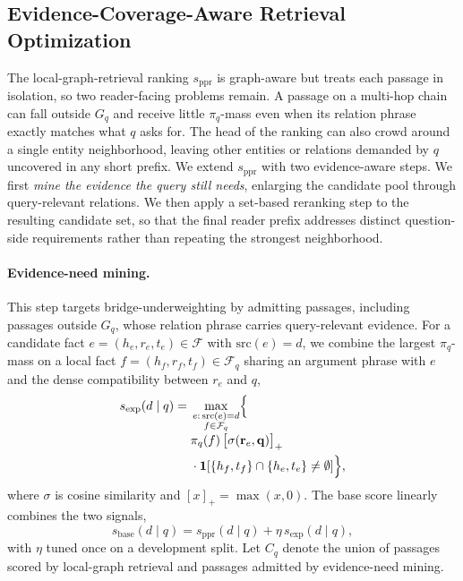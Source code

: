 \subsection{Evidence-Coverage-Aware Retrieval Optimization}
\label{sec:method:enhancement}

The local-graph-retrieval ranking $s_{\mathrm{ppr}}$ is graph-aware
but treats each passage in isolation, so two reader-facing problems
remain. A passage on a multi-hop chain can fall outside $G_q$ and
receive little $\pi_q$-mass even when its relation phrase exactly
matches what $q$ asks for. The head of the ranking can also crowd
around a single entity neighborhood, leaving other entities or
relations demanded by $q$ uncovered in any short prefix. We
extend $s_{\mathrm{ppr}}$ with two evidence-aware steps. We first
\emph{mine the evidence the query still needs}, enlarging the
candidate pool through query-relevant relations. We then apply a
set-based reranking step to the resulting candidate set, so that
the final reader prefix addresses distinct question-side
requirements rather than repeating the strongest neighborhood.

\paragraph{Evidence-need mining.}
This step targets bridge-underweighting by admitting passages,
including passages outside $G_q$, whose relation phrase carries
query-relevant evidence. For a candidate fact $e=(h_e,r_e,t_e)\in
\mathcal{F}$ with $\mathrm{src}(e)=d$, we combine the largest
$\pi_q$-mass on a local fact $f=(h_f,r_f,t_f)\in\mathcal{F}_q$
sharing an argument phrase with $e$ and the dense compatibility
between $r_e$ and $q$,
\begin{equation}
\label{eq:expansion-score}
\begin{aligned}
s_{\mathrm{exp}}(d \mid q)
= {}& \max_{\substack{e:\,\mathrm{src}(e)=d \\ f \in \mathcal{F}_q}}
\Bigl\{\\[-0.3em]
&\pi_q(f)\,\bigl[\sigma(\mathbf{r}_e,\mathbf{q})\bigr]_{+}\\
&{}\cdot\mathbf{1}\!\left[
\{h_f,t_f\}\cap\{h_e,t_e\}\neq\emptyset
\right]\Bigr\},
\end{aligned}
\end{equation}
where $\sigma$ is cosine similarity and $[x]_{+}=\max(x,0)$. The
base score linearly combines the two signals,
\begin{equation}
\label{eq:base-score}
s_{\mathrm{base}}(d \mid q)
=
s_{\mathrm{ppr}}(d \mid q)
+
\eta\,s_{\mathrm{exp}}(d \mid q),
\end{equation}
with $\eta$ tuned once on a development split. Let $C_q$ denote
the union of passages scored by local-graph retrieval and passages
admitted by evidence-need mining.

